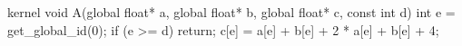 kernel void A(global float* a,
              global float* b,
              global float* c,
              const int d) {
  int e = get_global_id(0);
  if (e >= d) {
    return;
  }
  c[e] = a[e] + b[e] + 2 * a[e] + b[e] + 4;
}

